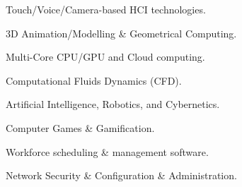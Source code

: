 

\begin{cventries}


  \cventry
    {} 
    {}
    {}
    {}
    {    	
	  \vspace{-1.7cm}
      \begin{multicols}{2}
      \begin{cvitems}
        \item {Touch/Voice/Camera-based HCI technologies.}
        \item {3D Animation/Modelling \& Geometrical Computing.}
        \item {Multi-Core CPU/GPU and Cloud computing.}
        \item {Computational Fluids Dynamics (CFD).}
        \item {Artificial Intelligence, Robotics, and Cybernetics.}
        \item {Computer Games \& Gamification.}
        \item {Workforce scheduling \& management software.}
        \item {Network Security \& Configuration \& Administration.}
      \end{cvitems}
	  \end{multicols}
	  \vspace{-0.5cm}
    }

\end{cventries}
